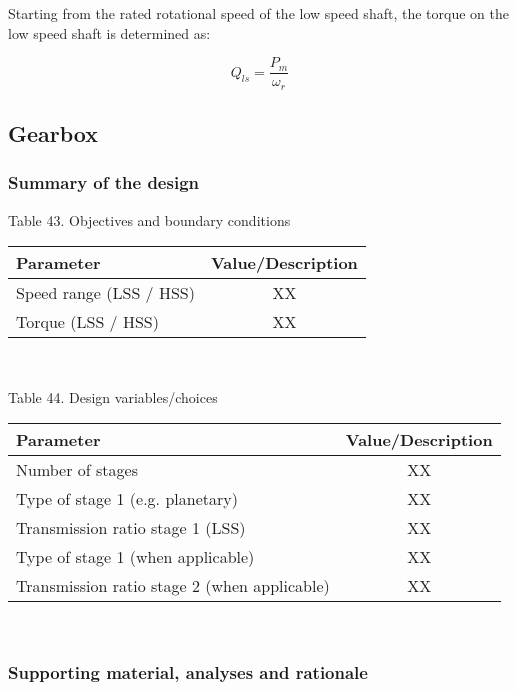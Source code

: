 Starting from the rated rotational speed of the low speed shaft, the torque on the low speed shaft is determined as: 

\begin{equation}
    Q_{ls} = \dfrac{P_{m}}{\omega_r}
    \label{eq:Q_ls}
\end{equation}



\subsection{Gearbox}

\subsubsection{Summary of the design}

\begin{center}
Table 43. Objectives and boundary conditions\\
\begin{tabular}{ |l|c| } 
\hline
\textbf{Parameter} & \textbf{Value/Description}  \\ 
\hline
Speed range (LSS / HSS) & XX  \\ 
\hline
Torque (LSS / HSS) & XX \\
\hline
\end{tabular} \\
\end{center}

\begin{center}
Table 44. Design variables/choices\\
\begin{tabular}{ |l|c| } 
\hline
\textbf{Parameter} & \textbf{Value/Description}  \\ 
\hline
Number of stages & XX  \\ 
\hline
Type of stage 1 (e.g. planetary) & XX \\
\hline
Transmission ratio stage 1 (LSS) & XX \\
\hline
Type of stage 1 (when applicable) & XX \\
\hline
Transmission ratio stage 2 (when applicable) & XX \\
\hline
\end{tabular} \\
\end{center}

\subsubsection{Supporting material, analyses and rationale}



